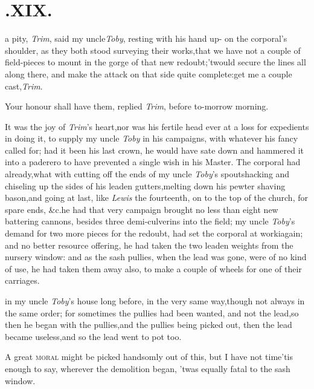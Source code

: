\documentclass{article}
\begin{document}
\section{.\enspace  XIX.}

 a pity, \textit{Trim}, said
my uncle\break \textit{Toby}, resting with his hand up-\break
on the corporal’s shoulder, as they both stood surveying their
works,\tsk that we have not a couple of field-pieces to mount in
the gorge of that new redoubt;\tsk ’twould secure the lines
all along there, and make the attack on that side quite
complete:\tsh get me a couple cast,\break \textit{Trim}.

Your honour shall have them, replied \textit{Trim}, before
to-morrow morning.

It was the joy of \textit{Trim}’s heart,\tsk nor was his fertile head
ever at a loss for expedients in doing it, to supply my uncle
\textit{Toby} in his campaigns, with whatever his fancy called for; had
it been his last crown, he would have sate down and hammered it into a
paderero to have prevented a single wish in his Master. The corporal
had already,\tsk what with cutting off the ends of my uncle
\textit{Toby}’s spouts\tsk hacking and chiseling up the sides of his
leaden gutters,\tsk melting down his pewter shaving bason,\tsk and
going at last, like \textit{Lewis} the fourteenth, on to the top of the
church, for spare ends, \&c.\tsh he had that very campaign brought no
less than eight new battering cannons, besides three demi-culverins
into the field; my uncle \textit{Toby}’s demand for two more pieces for
the redoubt, had set the corporal at worki\break again; and no better resource
offering, he had taken the two leaden weights from the nursery window:
and as the sash pullies, when the lead was gone, were of no kind of use,
he had taken them away also, to make a couple of wheels for one of their
carriages.

\break in my uncle
\textit{Toby}’s house long before, in the very same
way,\tsk though not always in the same order; for sometimes the\break
pullies had been wanted, and not the lead,\tsk so then he began
with the pullies,\break\tsk and the pullies being picked out, then the
lead became useless,\tsk and so the lead went to pot too.

\tsh  A great \textsc{moral} might be picked
handsomly out of this, but I have not time\tsk ’tis enough
to say, wherever the demolition began, ’twas equally fatal to
the sash window.
\end{document}
